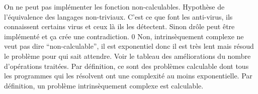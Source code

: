\begin{mcqs}
  {On ne peut pas implémenter les fonction non-calculables.}
  {Hypothèse de l'équivalence des langages non-triviaux.}
  {C'est ce que font les anti-virus,
  ils connaissent certains virus et ceux là ils les détectent.}
  {Sinon drôle peut être implémenté et ça crée une contradiction.}
  {0}
  {Non, intrinsèquement complexe ne veut pas dire ``non-calculable'',
  il est exponentiel donc il est très lent mais résoud le problème pour qui sait attendre.}
  {Voir le tableau des améliorations du nombre d'opérations traitées.}
  {Par définition, ce sont des problèmes calculable dont tous les
  programmes qui les résolvent ont une complexité au moins exponentielle.}
  {Par définition, un problème intrinsèquement complexe est calculable.}
\end{mcqs}

